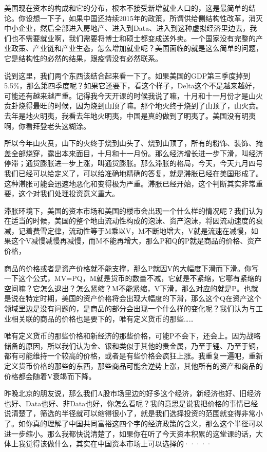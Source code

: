 \documentclass[UTF8, 12pt, a4paper]{ctexrep}
\begin{document}
美国现在资本的构成和它的分布，根本不接受新增就业人口的，这是最简单的结论。你设想一下子，如果中国还持续2015年的政策，所谓供给侧结构性改革，消灭中小企业，然后全部进入房地产、进入到Data、进入到这种虚拟经济里边去，我们也不需要就业啊，我们需要将博士和硕士都变成送外卖。一个国家没有完整的产业政策、产业链和产业生态，怎么增加就业呢？美国面临的就是这么简单的问题，它是结构性的必然的结果，跟疫情没有必然联系。

说到这里，我们两个东西该结合起来看一下了。如果美国的GDP第三季度掉到5.5\%，那么第四季度呢？如果它还要下，看这个样子，Delta这个不是越来越好，可能还有越来越严重。记得我今天开课的时候我说了嘛，十月和十一月份才是山火贲卦烧得最旺的时候，因为烧到山顶了嘛。那个地火终于烧到了山顶了，山火贲。去年是地火明夷，我看去年地火明夷，中国是真的做到了明夷了。美国没有明夷啊，你看拜登老头这糊涂。

所以今年山火贲，山下的火终于烧到山头了、烧到山顶了，所有的粉饰、装饰、掩盖全部烧穿，露出本来面目，十月和十一月份。那么经济增长进一步下滑，叫经济停滞；通货膨胀进一步上涨，叫通货膨胀。那么滞胀的格局，今天，今天九月四号我们已经可以给定义了，可以给准确地精确的答复，就是滞胀已经在美国形成了。这种滞胀可能会迅速地恶化和变得极为严重。滞胀已经开始，这个判断其实非常重要，这个对我们处理投资意义重大。

滞胀环境下，美国的资本市场和美国的楼市会出现一个什么样的情况呢？我们认为在适当的时候，美国的整个地由流动性构成的泡沫、资产泡沫，将因流动速度的衰减，记着费雪定律，流动性等于M乘以V，M不断地增大，V就是流速在减慢，如果这个V减慢减慢再减慢，而M不能再增大，那么P和Q的P就是商品的价格、资产价格，

商品的价格或者是资产价格就不能支撑，那么P就因V的大幅度下滑而下滑。你写一下这个公式，MV=PQ，M就是货币的数量不减，它就是不紧缩，它哪有紧缩的空间嘛？它怎么退出？怎么紧缩？M不能紧缩，V下滑，那么对应的就是P。也就是说在特定时期，美国的资产价格将会出现大幅度的下滑，那么这个Q在资产这个领域里边是没有问题的，是商品的部分会出现一个什么样的变化呢？我们认为与工业相关联的商品的价格也是要下的，唯有定义货币的那些……

唯有定义货币的那些价格和新经济的那些价格，可能P不会下，还会上。因为战略储备的原因，所以我们认为金、银和类似于其他的贵金属，乃至于锂、乃至于铜，都有可能维持一个较高的价格，或者是有些价格会疯狂上涨。我重复一遍吧，重新定义货币价格的那些的东西，那些商品可能会逆势上涨，其他所有的资产和商品的价格都会随着V衰竭而下降。

昨晚北京的朋友说，那么我们A股市场里边的好多这个经济，新经济也好、旧经济也好、Data也好、非Data也好，你怎么看呢？我的意思是说我把价格的事情已经说清楚了，筛选的半径就可以缩得很小了，就是我们选择投资的范围就变得非常小了。如你真的理解了中国共同富裕这四个字的经济政策的含义，那么这个半径可以进一步缩小。那么我都快说清楚了，如果你在听了今天资本积累的这堂课的话，大体上我觉得该做什么，其实在中国资本市场上可以选择的·····
\end{document}
